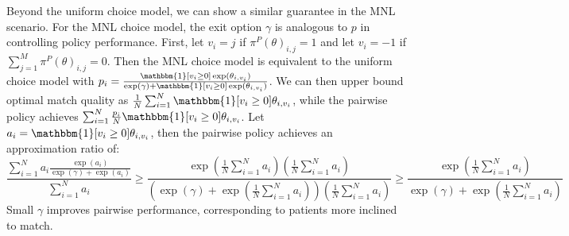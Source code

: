 Beyond the uniform choice model, we can show a similar guarantee in the MNL scenario. 
For the MNL choice model, the exit option $\gamma$ is analogous to $p$ in controlling policy performance.
First, let $v_{i}=j$ if $\pi^{P}(\theta)_{i,j}=1$ and let $v_{i} = -1$ if $\sum_{j=1}^{M} \pi^{P}(\theta)_{i,j} = 0$. 
Then the MNL choice model is equivalent to the uniform choice model with $p_{i}=\frac{\mathbbm{1}[v_{i} \geq 0] \exp(\theta_{i,v_{i}})}{\exp(\gamma) + \mathbbm{1}[v_{i} \geq 0] \exp(\theta_{i,v_{i}})}$. 
We can then upper bound optimal match quality as $\frac{1}{N} \sum_{i=1}^{N} \mathbbm{1}[v_{i} \geq 0] \theta_{i,v_{i}}$, while the pairwise policy achieves $ \sum_{i=1}^{N} \frac{p_{i}}{N} \mathbbm{1}[v_{i} \geq 0] \theta_{i,v_{i}}$. 
Let $a_{i} = \mathbbm{1}[v_{i} \geq 0] \theta_{i,v_{i}}$, then the pairwise policy achieves an approximation ratio of: 
\begin{equation}
    \frac{\sum_{i=1}^{N} a_{i} \frac{\exp(a_{i})}{\exp(\gamma)+\exp(a_{i})}}{\sum_{i=1}^{N} a_{i}} \geq \frac{\exp(\frac{1}{N} \sum_{i=1}^{N} a_{i}) (\frac{1}{N}\sum_{i=1}^{N} a_{i})}{(\exp(\gamma)+\exp(\frac{1}{N}\sum_{i=1}^{N} a_{i}))(\frac{1}{N}\sum_{i=1}^{N} a_{i})} \geq \frac{\exp(\frac{1}{N} \sum_{i=1}^{N} a_{i})}{\exp(\gamma)+\exp(\frac{1}{N}\sum_{i=1}^{N} a_{i})}  
\end{equation}
Small $\gamma$ improves pairwise performance, corresponding to patients more inclined to match. 

